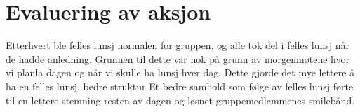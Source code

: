 \section{Evaluering av aksjon} 
Etterhvert ble felles lunsj normalen for gruppen, og alle tok del i felles lunsj når de hadde anledning. Grunnen til dette var nok på grunn av morgenmøtene hvor vi planla dagen og når vi skulle ha lunsj hver dag. Dette gjorde det mye lettere å ha en felles lunsj, bedre struktur Et bedre samhold som følge av felles lunsj førte til en lettere stemning resten av dagen og løsnet gruppemedlemmenes smilebånd.